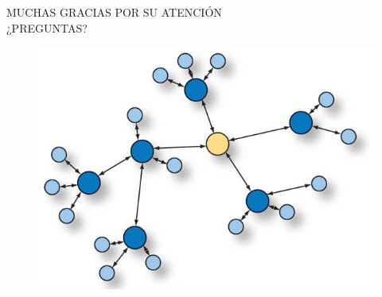 \documentclass[aspectratio=169]{beamer}
\begin{document}
\begingroup
\makeatletter
\setlength{\hoffset}{-.5\beamer@sidebarwidth}
\makeatother
\begin{frame}
\fontsize{18pt}{15}\selectfont
\begin{center}
	MUCHAS GRACIAS POR SU ATENCIÓN\\
	\vspace{2cm}
	¿PREGUNTAS?
	\begin{minipage}[c]{0.35\linewidth}
		\begin{figure}[H]
			\includegraphics[width=1\textwidth]{./imagenes/red.jpg}
		\end{figure}	  	  	
	\end{minipage}
\end{center}
\end{frame}
\endgroup
\end{document}
